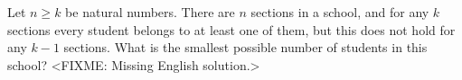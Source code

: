 \problem
Let $n \geq k$ be natural numbers.
There are $n$ sections in a school, and for any $k$ sections every student
belongs to at least one of them, but this does not hold for any $k - 1$
sections.
What is the smallest possible number of students in this school?
\solution
<FIXME: Missing English solution.>
\endproblem
